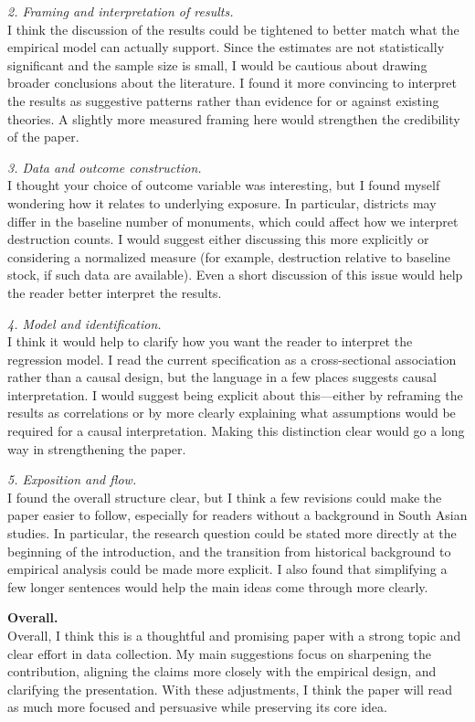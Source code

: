 \documentclass[12pt]{article}
\begin{document}
\textit{2. Framing and interpretation of results.} \\
I think the discussion of the results could be tightened to better match what the empirical model can actually support. Since the estimates are not statistically significant and the sample size is small, I would be cautious about drawing broader conclusions about the literature. I found it more convincing to interpret the results as suggestive patterns rather than evidence for or against existing theories. A slightly more measured framing here would strengthen the credibility of the paper.

\textit{3. Data and outcome construction.} \\
I thought your choice of outcome variable was interesting, but I found myself wondering how it relates to underlying exposure. In particular, districts may differ in the baseline number of monuments, which could affect how we interpret destruction counts. I would suggest either discussing this more explicitly or considering a normalized measure (for example, destruction relative to baseline stock, if such data are available). Even a short discussion of this issue would help the reader better interpret the results.

\textit{4. Model and identification.} \\
I think it would help to clarify how you want the reader to interpret the regression model. I read the current specification as a cross-sectional association rather than a causal design, but the language in a few places suggests causal interpretation. I would suggest being explicit about this—either by reframing the results as correlations or by more clearly explaining what assumptions would be required for a causal interpretation. Making this distinction clear would go a long way in strengthening the paper.

\textit{5. Exposition and flow.} \\
I found the overall structure clear, but I think a few revisions could make the paper easier to follow, especially for readers without a background in South Asian studies. In particular, the research question could be stated more directly at the beginning of the introduction, and the transition from historical background to empirical analysis could be made more explicit. I also found that simplifying a few longer sentences would help the main ideas come through more clearly.

\vspace{0.5em}
\noindent \textbf{Overall.} \\
Overall, I think this is a thoughtful and promising paper with a strong topic and clear effort in data collection. My main suggestions focus on sharpening the contribution, aligning the claims more closely with the empirical design, and clarifying the presentation. With these adjustments, I think the paper will read as much more focused and persuasive while preserving its core idea.
\end{document}
